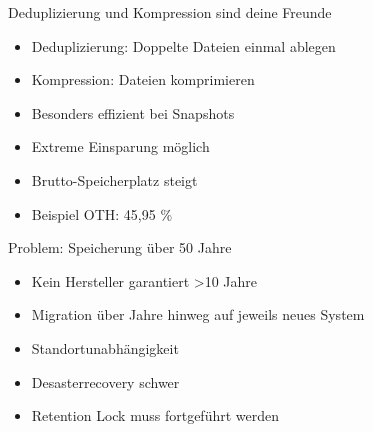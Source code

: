 \documentclass[10pt]{beamer}
\begin{document}
%
%
\begin{frame}[fragile]{Deduplizierung und Kompression sind deine Freunde}
	\begin{itemize}
	\item Deduplizierung: Doppelte Dateien einmal ablegen
	\item Kompression: Dateien komprimieren
	\item Besonders effizient bei Snapshots
	\item Extreme Einsparung möglich
	\item Brutto-Speicherplatz steigt
	\item Beispiel OTH: 45,95 \%
\end{itemize}
\end{frame}

%
%
\begin{frame}[fragile]{Problem: Speicherung über 50 Jahre}
	\begin{itemize}
	\item Kein Hersteller garantiert \textgreater 10 Jahre
	\item Migration über Jahre hinweg auf jeweils neues System
	\item Standortunabhängigkeit
	\item Desasterrecovery schwer
	\item Retention Lock muss fortgeführt werden
\end{itemize}
\end{frame}
\end{document}
